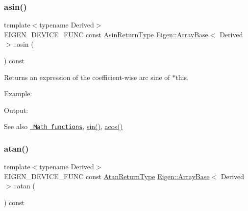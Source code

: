 \subsubsection{\texorpdfstring{asin()}{asin()}}
{\footnotesize\ttfamily template$<$typename Derived$>$ \\
E\+I\+G\+E\+N\+\_\+\+D\+E\+V\+I\+C\+E\+\_\+\+F\+U\+NC const \mbox{\hyperlink{class_eigen_1_1_cwise_unary_op}{Asin\+Return\+Type}} \mbox{\hyperlink{class_eigen_1_1_array_base}{Eigen\+::\+Array\+Base}}$<$ Derived $>$\+::asin (\begin{DoxyParamCaption}{ }\end{DoxyParamCaption}) const\hspace{0.3cm}{\ttfamily [inline]}}

\begin{DoxyReturn}{Returns}
an expression of the coefficient-\/wise arc sine of $\ast$this.
\end{DoxyReturn}
Example\+: 
\begin{DoxyCodeInclude}{0}
\end{DoxyCodeInclude}
 Output\+: 
\begin{DoxyVerbInclude}
\end{DoxyVerbInclude}


\begin{DoxySeeAlso}{See also}
\href{group__CoeffwiseMathFunctions.html\#cwisetable_asin}{\texttt{ Math functions}}, \mbox{\hyperlink{class_eigen_1_1_array_base_a8f857f93533ac386282f47c5ef05459a}{sin()}}, \mbox{\hyperlink{class_eigen_1_1_array_base_a823b8a01037260c26ea853f41a75dd87}{acos()}} 
\end{DoxySeeAlso}
\mbox{\label{class_eigen_1_1_array_base_a3d7c83346563ef1abac3c75615959595}} 
\subsubsection{\texorpdfstring{atan()}{atan()}}
{\footnotesize\ttfamily template$<$typename Derived$>$ \\
E\+I\+G\+E\+N\+\_\+\+D\+E\+V\+I\+C\+E\+\_\+\+F\+U\+NC const \mbox{\hyperlink{class_eigen_1_1_cwise_unary_op}{Atan\+Return\+Type}} \mbox{\hyperlink{class_eigen_1_1_array_base}{Eigen\+::\+Array\+Base}}$<$ Derived $>$\+::atan (\begin{DoxyParamCaption}{ }\end{DoxyParamCaption}) const\hspace{0.3cm}{\ttfamily [inline]}}

